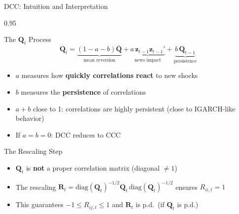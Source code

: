 \documentclass[9pt, aspectratio=169, t]{beamer}
\begin{document}
\begin{frame}{DCC: Intuition and Interpretation}
    \begin{cminipage}{0.95\textwidth}
    {\footnotesize
    \begin{block}{The $\mathbf{Q}_t$ Process}
        \[
            \mathbf{Q}_t = \underbrace{(1-a-b)\bar{\mathbf{Q}}}_{\text{mean reversion}} + \underbrace{a\,\mathbf{z}_{t-1}\mathbf{z}_{t-1}'}_{\text{news impact}} + \underbrace{b\,\mathbf{Q}_{t-1}}_{\text{persistence}}
        \]
        \begin{itemize}\setlength{\itemsep}{0pt}
            \item $a$ measures how \textbf{quickly correlations react} to new shocks
            \item $b$ measures the \textbf{persistence} of correlations
            \item $a + b$ close to 1: correlations are highly persistent (close to IGARCH-like behavior)
            \item If $a = b = 0$: DCC reduces to CCC
        \end{itemize}
    \end{block}
    \vspace{0.1cm}
    \begin{block}{The Rescaling Step}
        \begin{itemize}\setlength{\itemsep}{0pt}
            \item $\mathbf{Q}_t$ is \textbf{not} a proper correlation matrix (diagonal $\neq 1$)
            \item The rescaling $\mathbf{R}_t = \text{diag}(\mathbf{Q}_t)^{-1/2}\mathbf{Q}_t\,\text{diag}(\mathbf{Q}_t)^{-1/2}$ ensures $R_{ii,t} = 1$
            \item This guarantees $-1 \leq R_{ij,t} \leq 1$ and $\mathbf{R}_t$ is p.d.\ (if $\mathbf{Q}_t$ is p.d.)
        \end{itemize}
    \end{block}
    }
    \end{cminipage}
\end{frame}
\end{document}
